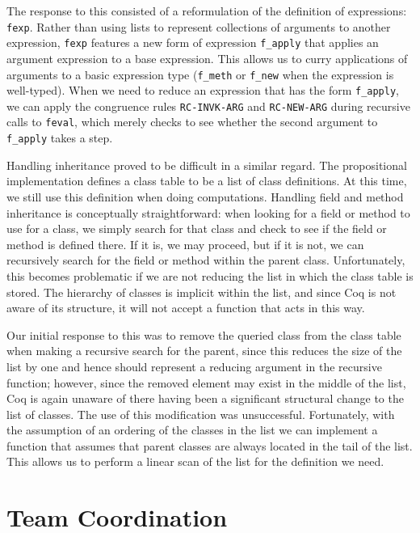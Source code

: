 \documentclass{article}
\begin{document}
The response to this consisted of a reformulation of the definition of expressions: \texttt{fexp}. Rather than using lists to represent collections of arguments to another expression, \texttt{fexp} features a new form of expression \texttt{f\_apply} that applies an argument expression to a base expression. This allows us to curry applications of arguments to a basic expression type (\texttt{f\_meth} or \texttt{f\_new} when the expression is well-typed). When we need to reduce an expression that has the form \texttt{f\_apply}, we can apply the congruence rules \texttt{RC-INVK-ARG} and \texttt{RC-NEW-ARG} during recursive calls to \texttt{feval}, which merely checks to see whether the second argument to \texttt{f\_apply} takes a step.

Handling inheritance proved to be difficult in a similar regard. The propositional implementation defines a class table to be a list of class definitions. At this time, we still use this definition when doing computations. Handling field and method inheritance is conceptually straightforward: when looking for a field or method to use for a class, we simply search for that class and check to see if the field or method is defined there. If it is, we may proceed, but if it is not, we can recursively search for the field or method within the parent class. Unfortunately, this becomes problematic if we are not reducing the list in which the class table is stored. The hierarchy of classes is implicit within the list, and since Coq is not aware of its structure, it will not accept a function that acts in this way.

Our initial response to this was to remove the queried class from the class table when making a recursive search for the parent, since this reduces the size of the list by one and hence should represent a reducing argument in the recursive function; however, since the removed element may exist in the middle of the list, Coq is again unaware of there having been a significant structural change to the list of classes. The use of this modification was unsuccessful. Fortunately, with the assumption of an ordering of the classes in the list we can implement a function that assumes that parent classes are always located in the tail of the list. This allows us to perform a linear scan of the list for the definition we need.

\section{Team Coordination}
\end{document}
